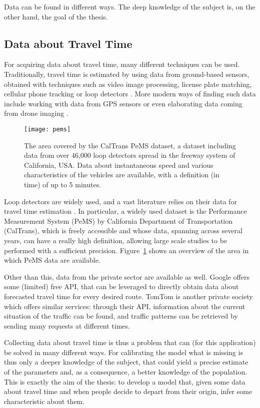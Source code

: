 Data can be found in different ways.
The deep knowledge of the subject is, on the other hand, the goal of the thesis.

\subsection{Data about Travel Time}
\label{sec:data-about-travel}

For acquiring data about travel time, many different techniques can be used.
Traditionally, travel time is estimated by using data from ground-based sensors,
obtained with techniques such as video image processing, license plate matching, cellular phone tracking or loop detectors \parencite{turner1996advanced,YEON2008325}.
More modern ways of finding such data include working with data from GPS sensors \parencite{mazare2012trade} or even elaborating data coming from drone imaging \parencite{fonod2025songdo}.

\begin{figure}
  \centering
  \texttt{[image: pems]}
  \caption{The area covered by the CalTrans PeMS dataset, a dataset including data from over 46,000 loop detectors spread in the freeway system of California, USA. Data about instantaneous speed and various characteristics of the vehicles are available, with a definition (in time) of up to 5 minutes.}
  \label{fig:pems}
\end{figure}

Loop detectors are widely used, and a vast literature relies on their data for travel time estimation \parencite{YILDIRIMOGLU201345}.
In particular, a widely used dataset is the Performance Measurement System (PeMS) by California Department of Transportation (CalTrans),
which is freely accessible and whose data, spanning across several years,
can have a really high definition,
allowing large scale studies to be performed with a sufficient precision.
Figure~\ref{fig:pems} shows an overview of the area in which PeMS data are available.

Other than this, data from the private sector are available as well.
Google offers some (limited) free API,
that can be leveraged to directly obtain data about forecasted travel time for every desired route.
TomTom is another private society which offers similar services:
through their API, information about the current situation of the traffic can be found,
and traffic patterns can be retrieved by sending many requests at different times.

Collecting data about travel time is thus a problem that can (for this application) be solved in many different ways.
For calibrating the model what is missing is thus only a deeper knowledge of the subject,
that could yield a precise estimate of the parameters and, as a consequence,
a better knowledge of the population.
This is exactly the aim of the thesis:
to develop a model that, given some data about travel time and when people decide to depart from their origin,
infer some characteristic about them.

